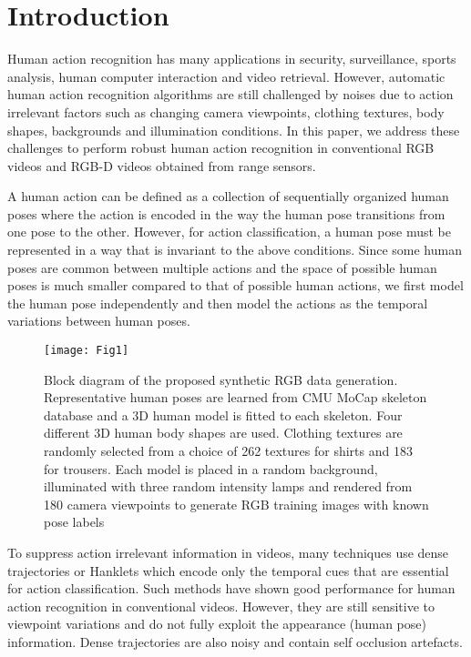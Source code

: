 \documentclass[twocolumn]{svjour3}          \smartqed  \usepackage{graphicx}
\begin{document}
\vspace{-7mm}
\section{Introduction}
\label{intro}
Human action recognition has many applications in security, surveillance, sports analysis, human computer interaction and video retrieval. However, automatic human action recognition algorithms are still challenged by noises due to action irrelevant factors such as changing camera viewpoints, clothing textures, body shapes, backgrounds and illumination conditions. In this paper, we address these challenges to perform robust human action recognition in conventional RGB videos and RGB-D videos obtained from range sensors.

A human action can be defined as a collection of sequentially organized human poses where the action is encoded in the way the human pose transitions from one pose to the other. However, for action classification, a human pose must be represented in a way that is invariant to the above conditions. Since some human poses are common between multiple actions and the space of possible human poses is much smaller compared to that of possible human actions, we first model the human pose independently and then model the actions as the temporal variations between human poses.

\begin{figure*}
\centering
  \texttt{[image: Fig1]}
\caption{Block diagram of the proposed synthetic RGB data generation. Representative human poses are learned from CMU MoCap skeleton database and a 3D human model is fitted to each skeleton. Four different 3D human body shapes are used. Clothing textures are randomly selected from a choice of 262 textures for shirts and 183 for trousers. Each model is placed in a random background, illuminated with three random intensity lamps and rendered from 180 camera viewpoints to generate RGB training images with known pose labels}
\label{fig:synthetic_gen}
\end{figure*}


To suppress action irrelevant information in videos, many techniques use dense trajectories \citep{nCTE, wang2011action, wang2013dense, wang2013action} or Hanklets \citep{Hankelets} which encode only the temporal cues that are essential for action classification. Such methods have shown good performance for human action recognition in conventional videos. However, they are still sensitive to viewpoint variations and do not fully exploit the appearance (human pose) information. Dense trajectories are also noisy and contain self occlusion artefacts.
\end{document}
